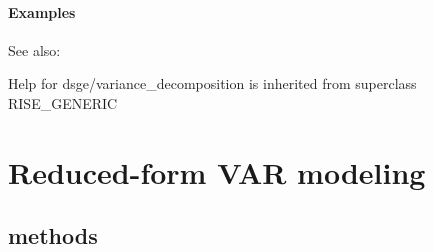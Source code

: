\documentclass[letterpaper,10pt,english]{sphinxmanual}
\begin{document}
\subsubsection{Examples}
\label{classes/models/@dsge/dsge:id214}
See also:

Help for dsge/variance\_decomposition is inherited from superclass RISE\_GENERIC


\chapter{Reduced-form VAR modeling}
\label{classes/models/@rfvar/rfvar::doc}\label{classes/models/@rfvar/rfvar:reduced-form-var-modeling}

\section{methods}
\end{document}

